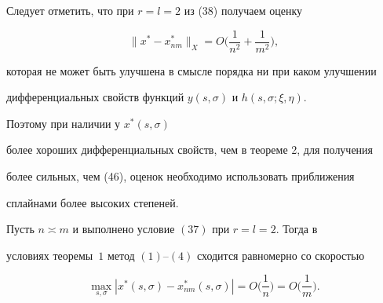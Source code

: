 Следует отметить, что при $r=l=2$ из (38) получаем оценку 


\begin{equation} 


\|x^*-x^*_{nm}\|_X=O\bigg(\frac{1}{n^2}+\frac{1}{m^2} \bigg), 


\end{equation} 


которая не может быть улучшена в смысле порядка ни при каком улучшении 


дифференциальных свойств функций $y(s,\sigma)$ и $h(s,\sigma;\xi,\eta)$. 


Поэтому при наличии у $x^*(s,\sigma)$ 


более хороших дифференциальных свойств, чем в теореме 2, для получения 


более сильных, чем (46), оценок необходимо использовать приближения 


сплайнами более высоких степеней. 


 


\begin{thm} 


Пусть $n\asymp m$ и выполнено условие $(37)$ при $r=l=2$. Тогда в 


условиях теоремы~$1$ метод $(1)$--$(4)$ сходится равномерно со скоростью 


\begin{equation} 


\max_{s,\sigma}|x^*(s,\sigma)-x^*_{nm}(s,\sigma)|=O 


\bigg(\frac{1}{n} \bigg)=O\bigg(\frac{1}{m} \bigg). 


\end{equation} 


\end{thm} 


 


